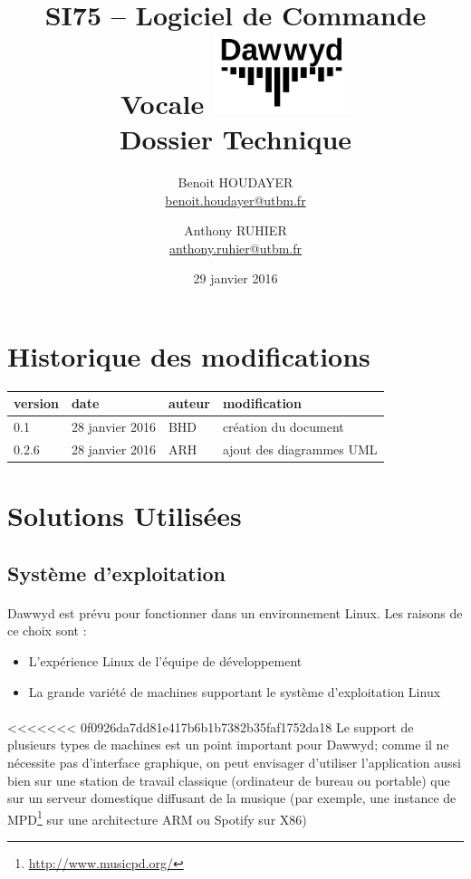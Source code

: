\documentclass[12pt]{article}
\title{\vspace{-1cm}\textbf{%
    SI75 -- Logiciel de Commande Vocale \vspace{0.5cm}
    \protect\includegraphics[width=4cm]{logo.jpg}\\[0.5em]
    Dossier Technique}}
\author{Benoit HOUDAYER \\ \href{mailto:benoit.houdayer@utbm.fr}{benoit.houdayer@utbm.fr}
\and Anthony RUHIER \\ \href{mailto:anthony.ruhier@utbm.fr}{anthony.ruhier@utbm.fr}}
\date{29 janvier 2016}
\begin{document}
    \maketitle
    \thispagestyle{empty}
    \tableofcontents
    \listoffigures

    \section*{Historique des modifications}

    \begin{table}[H]
    \centering

    \begin{tabular}{|l|l|l|l|}
        \hline
        version & date & auteur & modification \\
        \hline
        0.1 & 28 janvier 2016 & BHD & création du document \\
        0.2.6 & 28 janvier 2016 & ARH & ajout des diagrammes UML \\
        \hline
    \end{tabular}
    \end{table}

    \afterpage{\cfoot{\thepage}}
    \newpage

    \section{Solutions Utilisées}
	    \subsection{Système d'exploitation}
	    \paragraph{}
        Dawwyd est prévu pour fonctionner dans un environnement Linux. Les
        raisons de ce choix sont :
	    \begin{itemize}
	    	\item L'expérience Linux de l'équipe de développement
            \item La grande variété de machines supportant le système
                d'exploitation Linux
	    \end{itemize}

	    \paragraph{}
<<<<<<< 0f0926da7dd81e417b6b1b7382b35faf1752da18
        Le support de plusieurs types de machines est un point important pour
        Dawwyd; comme il ne nécessite pas d'interface graphique, on peut
        envisager d'utiliser l'application aussi bien sur une station de
        travail classique (ordinateur de bureau ou portable) que sur un serveur
        domestique diffusant de la musique (par exemple, une instance de
        MPD\footnote{\url{http://www.musicpd.org/}} sur une architecture ARM ou
        Spotify sur X86)
\end{document}
